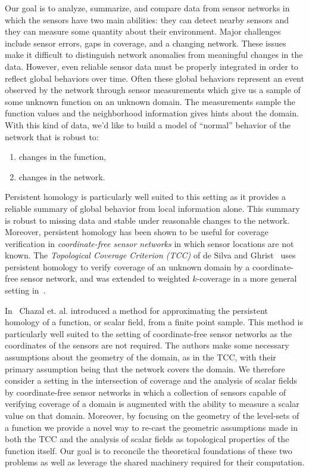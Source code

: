 Our goal is to analyze, summarize, and compare data from sensor networks in which the sensors have two main abilities: they can detect nearby sensors and they can measure some quantity about their environment.
Major challenges include sensor errors, gaps in coverage, and a changing network.
These issues make it difficult to distinguish network anomalies from meaningful changes in the data.
However, even reliable sensor data must be properly integrated in order to reflect global behaviors over time.
Often these global behaviors represent an event observed by the network through sensor measurements which give us a sample of some unknown function on an unknown domain.
The measurements sample the function values and the neighborhood information gives hints about the domain.
With this kind of data, we'd like to build a model of ``normal'' behavior of the network that is robust to:
\begin{enumerate}
    \item changes in the function,
    \item changes in the network.
\end{enumerate}

Persistent homology is particularly well suited to this setting as it provides a reliable summary of global behavior from local information alone.
This summary is robust to missing data and stable under reasonable changes to the network.
Moreover, persistent homology has been shown to be useful for coverage verification in \emph{coordinate-free sensor networks} in which sensor locations are not known.
The \emph{Topological Coverage Criterion (TCC)} of de Silva and Ghrist~\cite{desilva07coverage} uses persistent homology to verify coverage of an unknown domain by a coordinate-free sensor network, and was extended to weighted $k$-coverage in a more general setting in~\cite{cavanna2017when}.

In~\cite{chazal09analysis} Chazal et. al. introduced a method for approximating the persistent homology of a function, or scalar field, from a finite point sample.
This method is particularly well suited to the setting of coordinate-free sensor networks as the coordinates of the sensors are not required.
The authors make some necessary assumptions about the geometry of the domain, as in the TCC, with their primary assumption being that the network covers the domain.
We therefore consider a setting in the intersection of coverage and the analysis of scalar fields by coordinate-free sensor networks in which a collection of sensors capable of verifying coverage of a domain is augmented with the ability to measure a scalar value on that domain.
Moreover, by focusing on the geometry of the level-sets of a function we provide a novel way to re-cast the geometric assumptions made in both the TCC and the analysis of scalar fields as topological properties of the function itself.
Our goal is to reconcile the theoretical foundations of these two problems as well as leverage the shared machinery required for their computation.

